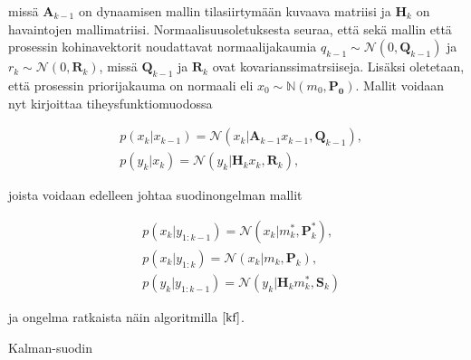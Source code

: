 \documentclass[
  12pt,
  a4paper, twoside]{book}
\begin{document}
missä \(\mathbf{A}_{k-1}\) on dynaamisen mallin tilasiirtymään kuvaava matriisi ja \(\mathbf{H}_k\) on havaintojen mallimatriisi. Normaalisuusoletuksesta seuraa, että sekä mallin että prosessin kohinavektorit noudattavat normaalijakaumia \(q_{k-1} \sim \mathcal{N}(0, \mathbf{Q}_{k-1})\) ja \(r_k \sim \mathcal{N}(0, \mathbf{R}_k)\), missä \(\mathbf{Q}_{k-1}\) ja \(\mathbf{R}_k\) ovat kovarianssimatrsiiseja. Lisäksi oletetaan, että prosessin priorijakauma on normaali eli \(x_0 \sim \mathbb{N}(m_0, \mathbf{P_0})\). Mallit voidaan nyt kirjoittaa tiheysfunktiomuodossa

\begin{align}
&\label{kalman-malli-pdf1}p(x_k|x_{k-1})=\mathcal{N}(x_k|\mathbf{A}_{k-1}x_{k-1},\mathbf{Q}_{k-1}),\\
&\label{kalman-malli-pdf2}p(y_k|x_k)=\mathcal{N}(y_k|\mathbf{H}_{k}x_{k},\mathbf{R}_{k}),
\end{align}

joista voidaan edelleen johtaa suodinongelman mallit

\begin{align}
&\label{kalman-malli-suodin1}p(x_k|y_{1:k-1})=\mathcal{N}(x_k|m_k^* ,\mathbf{P}_k^*),\\
&\label{kalman-malli-suodin2}p(x_k|y_{1:k})=\mathcal{N}(x_k|m_k ,\mathbf{P}_k),\\
&\label{kalman-malli-suodin3}p(y_k|y_{1:k-1})=\mathcal{N}(y_k|\mathbf{H}_k m_k^* ,\mathbf{S}_k)
\end{align}

ja ongelma ratkaista näin algoritmilla \(\ref{kf}\).

\begin{algorithm}[H]
\label{kf}
\DontPrintSemicolon
\SetAlgoShortEnd
{}
\caption{Kalman-suodin}
\end{algorithm}
\end{document}
